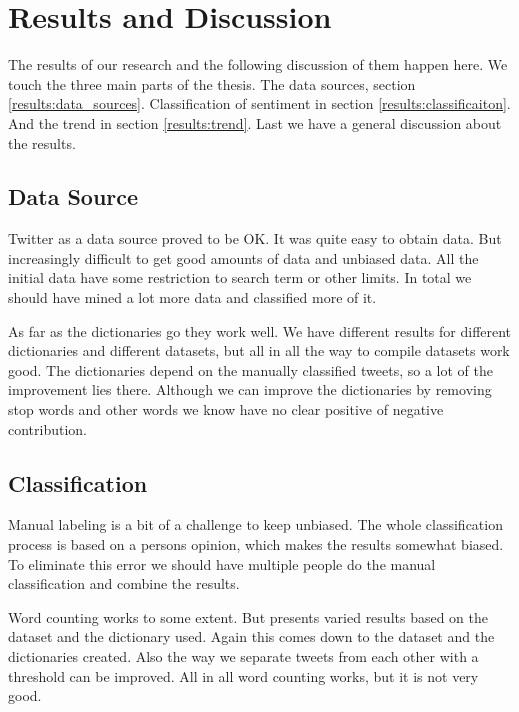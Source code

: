 \chapter{Results and Discussion}\label{results}

The results of our research and the following discussion of them happen here.
We touch the three main parts of the thesis. The data sources, section
\ref{results:data_sources}. Classification of sentiment in section
\ref{results:classificaiton}. And the trend in section \ref{results:trend}.
Last we have a general discussion about the results. 
%

\section{Data Source}
Twitter as a data source proved to be OK. It was quite easy to obtain data. But
increasingly difficult to get good amounts of data and unbiased data. All the
initial data have some restriction to search term or other limits. In total we
should have mined a lot more data and classified more of it. 

As far as the dictionaries go they work well. We have different results for
different dictionaries and different datasets, but all in all the way to
compile datasets work good. The dictionaries depend on the manually classified
tweets, so a lot of the improvement lies there. Although we can improve the
dictionaries by removing stop words and other words we know have no clear
positive of negative contribution. 
%

\section{Classification}
Manual labeling is a bit of a challenge to keep unbiased. The whole
classification process is based on a persons opinion, which makes the results
somewhat biased. To eliminate this error we should have multiple people do the
manual classification and combine the results.  

Word counting works to some extent. But presents varied results based on the
dataset and the dictionary used. Again this comes down to the dataset and the
dictionaries created. Also the way we separate tweets from each other with a
threshold can be improved. All in all word counting works, but it is not very
good. 

